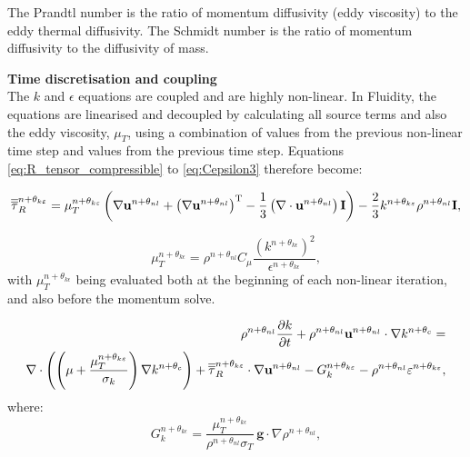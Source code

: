 The Prandtl number is the ratio of momentum diffusivity (eddy viscosity) to the eddy
thermal diffusivity. The Schmidt number is the ratio of momentum diffusivity to the
diffusivity of mass.

\par{\textbf{Time discretisation and coupling}\\}
The $k$ and $\epsilon$ equations are coupled and are highly non-linear. In Fluidity, the
equations are linearised and decoupled by calculating all source terms and also the eddy
viscosity, $\mu_T$, using a combination of values from the previous non-linear time step
and values from the previous time step. Equations \ref{eq:R_tensor_compressible} to
\ref{eq:Cepsilon3} therefore become:

\begin{equation}\label{eq:R_tensor_compressible_td}
  \overline{\overline{\tau}}_{R}^{n+\theta_{k\varepsilon}} = \mu_T^{n+\theta_{k\varepsilon}} \left( \nabla\mathbf{u}^{n+\theta_{nl}} + \left(\nabla\mathbf{u}^{n+\theta_{nl}}\right)^{\mathrm{T}} - \frac{1}{3}\left(\nabla\cdot\mathbf{u}^{n+\theta_{nl}}\right)\mathbf{I} \right) - \frac{2}{3} k^{n+\theta_{k\varepsilon}}\rho^{n+\theta_{nl}}\mathbf{I},
\end{equation}

\begin{equation}\label{eq:nut_td}
  \mu_T^{n+\theta_{k\epsilon}} = \rho^{n+\theta_{nl}} C_\mu \frac{(k^{n+\theta_{k\epsilon}})^2}{\epsilon^{n+\theta_{k\epsilon}}},
\end{equation}
\noindent with $\mu_T^{n+\theta_{k\epsilon}}$ being evaluated both at the beginning of
each non-linear iteration, and also before the momentum solve.

\begin{align}\label{eq:k_td}
  \rho^{n+\theta_{nl}} \frac{\partial k}{\partial t} + \rho^{n+\theta_{nl}}
  \mathbf{u}^{n+\theta_{nl}} \cdot \nabla k^{n+\theta_{c}} =
  \nonumber \\
  \nabla\cdot\left(\left(\mu + \frac{\mu_T^{n+\theta_{k\varepsilon}}}{\sigma_k}\right) \nabla
    k^{n+\theta_{c}} \right) + \overline{\overline{\tau}}_R^{n+\theta_{k\varepsilon}} \cdot
  \nabla\mathbf{u}^{n+\theta_{nl}} - G_k^{n+\theta_{k\varepsilon}} - \rho^{n+\theta_{nl}}
  \varepsilon^{n+\theta_{k\varepsilon}} ,
\end{align}
\noindent where:
\begin{equation}\label{eq:g_k_td}
  G_k^{n+\theta_{k\epsilon}} = \frac{\mu_T^{n+\theta_{k\epsilon}}}{\rho^{n+\theta_{nl}}\sigma_T} \, \mathbf{g}\cdot\nabla\rho^{n+\theta_{nl}},
\end{equation}


